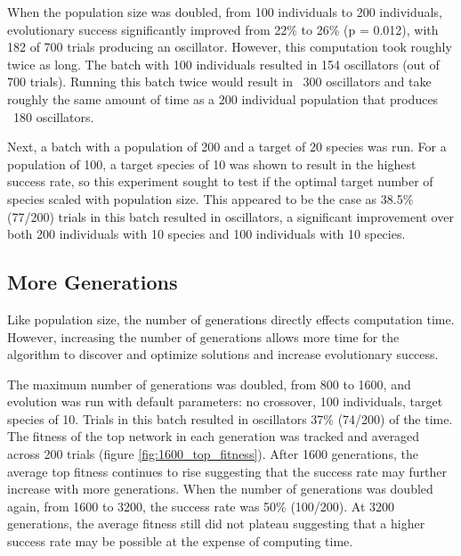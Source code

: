 \documentclass[12pt]{report}
\begin{document}
When the population size was doubled, from 100 individuals to 200 individuals, evolutionary success significantly improved from 22\% to 26\% (p = 0.012), with 182 of 700 trials producing an oscillator. However, this computation took roughly twice as long. The batch with 100 individuals resulted in 154 oscillators (out of 700 trials). Running this batch twice would result in ~300 oscillators and take roughly the same amount of time as a 200 individual population that produces ~180 oscillators.

Next, a batch with a population of 200 and a target of 20 species was run. For a population of 100, a target species of 10 was shown to result in the highest success rate, so this experiment sought to test if the optimal target number of species scaled with population size. This appeared to be the case as 38.5\% (77/200) trials in this batch resulted in oscillators, a significant improvement over both 200 individuals with 10 species and 100 individuals with 10 species. 

\subsection{More Generations}
Like population size, the number of generations directly effects computation time. However, increasing the number of generations allows more time for the algorithm to discover and optimize solutions and increase evolutionary success. 

The maximum number of generations was doubled, from 800 to 1600, and evolution was run with default parameters: no crossover, 100 individuals, target species of 10. Trials in this batch resulted in oscillators 37\% (74/200) of the time. The fitness of the top network in each generation was tracked and averaged across 200 trials (figure \ref{fig:1600_top_fitness}). After 1600 generations, the average top fitness continues to rise suggesting that the success rate may further increase with more generations. When the number of generations was doubled again, from 1600 to 3200, the success rate was 50\% (100/200). At 3200 generations, the average fitness still did not plateau suggesting that a higher success rate may be possible at the expense of computing time.
 
\end{document}
